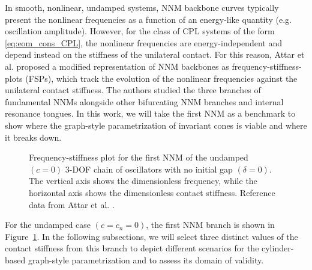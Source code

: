 \documentclass[a4paper,9pt,parskip=half,english]{article}
\theoremstyle{plain}
\theoremstyle{definition}
\begin{document}
In smooth, nonlinear, undamped systems, NNM backbone curves typically present the nonlinear frequencies as a function of an energy-like quantity (e.g. oscillation amplitude). However, for the class of CPL systems of the form \eqref{eq:eom_cons_CPL}, the nonlinear frequencies are energy-independent and depend instead on the stiffness of the unilateral contact. For this reason, Attar et al. \cite{Attar2017} proposed a modified representation of NNM backbones as frequency-stiffness-plots (FSPs), which track the evolution of the nonlinear frequencies against the unilateral contact stiffness. The authors studied the three branches of fundamental NNMs alongside other bifurcating NNM branches and internal resonance tongues. In this work, we will take the first NNM as a benchmark to show where the graph-style parametrization of invariant cones is viable and where it breaks down. 
\begin{figure}[h]
	\centering	
	\caption{Frequency-stiffness plot for the first NNM of the undamped $(c=0)$ 3-DOF chain of oscillators with no initial gap $(\delta=0)$. The vertical axis shows the dimensionless frequency, while the horizontal axis shows the dimensionless contact stiffness. Reference data from Attar et al. \cite{Attar2017}.}
	\label{fig_NNMbranch}
\end{figure}%
For the undamped case $(c=c_n=0)$, the first NNM branch is shown in Figure~\ref{fig_NNMbranch}. In the following subsections, we will select three distinct values of the contact stiffness from this branch to depict different scenarios for the cylinder-based graph-style parametrization and to assess its domain of validity. 
\end{document}
